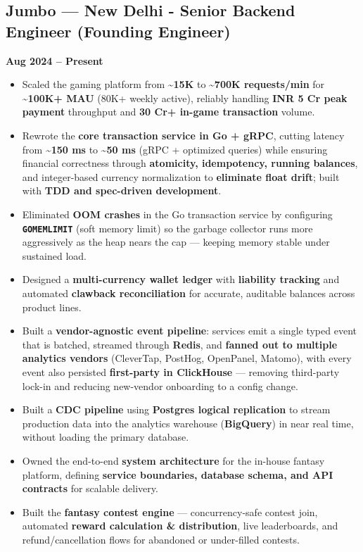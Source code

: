 \documentclass[a4paper,10pt]{article}
\begin{document}
\subsection*{{\color{accent}Jumbo --- New Delhi} \textnormal{-} Senior Backend Engineer (Founding Engineer)}
\textbf{Aug 2024 -- Present}
\begin{itemize}
  \item Scaled the gaming platform from \textbf{\textasciitilde{}15K} to \textbf{\textasciitilde{}700K requests/min} for \textbf{\textasciitilde{}100K+ MAU} (80K+ weekly active), reliably handling \textbf{INR 5 Cr peak payment} throughput and \textbf{30 Cr+ in-game transaction} volume.
  \item Rewrote the \textbf{core transaction service in Go + gRPC}, cutting latency from \textbf{\textasciitilde{}150 ms} to \textbf{\textasciitilde{}50 ms} (gRPC + optimized queries) while ensuring financial correctness through \textbf{atomicity, idempotency, running balances}, and integer-based currency normalization to \textbf{eliminate float drift}; built with \textbf{TDD and spec-driven development}.
  \item Eliminated \textbf{OOM crashes} in the Go transaction service by configuring \textbf{\texttt{GOMEMLIMIT}} (soft memory limit) so the garbage collector runs more aggressively as the heap nears the cap --- keeping memory stable under sustained load.
  \item Designed a \textbf{multi-currency wallet ledger} with \textbf{liability tracking} and automated \textbf{clawback reconciliation} for accurate, auditable balances across product lines.
  \item Built a \textbf{vendor-agnostic event pipeline}: services emit a single typed event that is batched, streamed through \textbf{Redis}, and \textbf{fanned out to multiple analytics vendors} (CleverTap, PostHog, OpenPanel, Matomo), with every event also persisted \textbf{first-party in ClickHouse} --- removing third-party lock-in and reducing new-vendor onboarding to a config change.
  \item Built a \textbf{CDC pipeline} using \textbf{Postgres logical replication} to stream production data into the analytics warehouse (\textbf{BigQuery}) in near real time, without loading the primary database.
  \item Owned the end-to-end \textbf{system architecture} for the in-house fantasy platform, defining \textbf{service boundaries, database schema, and API contracts} for scalable delivery.
  \item Built the \textbf{fantasy contest engine} --- concurrency-safe contest join, automated \textbf{reward calculation \& distribution}, live leaderboards, and refund/cancellation flows for abandoned or under-filled contests.

\end{itemize}
\end{document}
